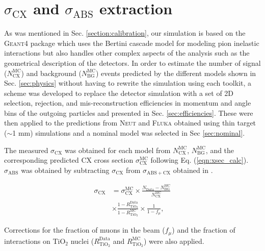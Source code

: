 \section{$\sigma_{\mathrm{CX}}$ and $\sigma_{\mathrm{ABS}}$ extraction}\label{sec:xsec}
As was mentioned in Sec. \ref{section:calibration}, our simulation is based on the \textsc{Geant4} package which uses the Bertini cascade model for modeling pion inelastic interactions but also handles other complex aspects of the analysis such as the geometrical description of the detectors. In order to estimate the number of signal ($N_{\mathrm{CX}}^{\mathrm{MC}}$) and background ($N_{\mathrm{BG}}^{\mathrm{MC}}$) events predicted by the different models shown in Sec. \ref{sec:physics} without having to rewrite the simulation using each toolkit, a scheme was developed to replace the detector simulation with a set of 2D selection, rejection, and mis-reconstruction efficiencies in momentum and angle bins of the outgoing particles and presented in Sec. \ref{sec:efficiencies}. These were then applied to the predictions from \textsc{Neut} and \textsc{Fluka} obtained using thin target ($\sim$1 mm) simulations and a nominal model was selected in Sec \ref{sec:nominal}.

The measured $\sigma_{\mathrm{CX}}$ was obtained for each model from $N_{\mathrm{CX}}^{\mathrm{MC}}$, $N_{\mathrm{BG}}^{\mathrm{MC}}$, and the corresponding predicted CX cross section $\sigma_{\mathrm{CX}}^{\mathrm{MC}}$ following Eq. (\ref{eqn:xsec_calc}). $\sigma_{\mathrm{ABS}}$ was obtained by subtracting $\sigma_{\mathrm{CX}}$ from $\sigma_{\mathrm{ABS+CX}}$ obtained in \cite{duet}.

 \begin{equation} \label{eqn:xsec_calc}
 \begin{aligned}
 \sigma_{\mathrm{CX}} &= 
 \sigma_{\mathrm{CX}}^{\mathrm{MC}}
 \times \frac{N_{\mathrm{Data}}-N_{\mathrm{BG}}^{\mathrm{MC}}}{N_{\mathrm{CX}}^{\mathrm{MC}}} \\
 &\times
 \frac{1-R_{\mathrm{TiO}_2}^{\mathrm{Data}}}{1-R_{\mathrm{TiO}_2}^{\mathrm{MC}}}
 \times \frac{1}{1-f_{\mu}},
 \end{aligned}
 \end{equation} 

Corrections for the fraction of muons in the beam ($f_{\mu}$) and the fraction of interactions on TiO$_2$ nuclei ($R_{\mathrm{TiO}_2}^{\mathrm{Data}}$ and $R_{\mathrm{TiO}_2}^{\mathrm{MC}}$) were also applied. 

